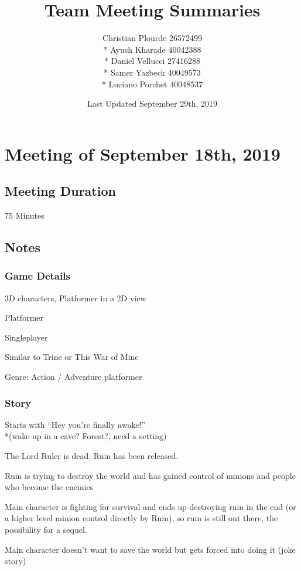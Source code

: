 \documentclass{article}
\begin{document}
\title{Team Meeting Summaries}
\author{Christian Plourde 26572499\\*
		Ayush Kharade 40042388\\*
		Daniel Vellucci 27416288\\*
		Samer Yazbeck 40049573\\*
		Luciano Porchet 40048537
		}
\date{Last Updated September 29th, 2019}

\maketitle

\newpage

\section{Meeting of September 18th, 2019}

\subsection{Meeting Duration}
75 Minutes

\subsection{Notes}
\subsubsection{Game Details}
\begin{description}
\item 3D characters, Platformer in a 2D view
\item Platformer
\item Singleplayer
\item Similar to Trine or This War of Mine
\item Genre: Action / Adventure platformer
\end{description}

\subsubsection{Story}
\begin{description}
\item Starts with “Hey you're finally awake!”\\*(wake up in a cave? Forest?, need a setting)
\item The Lord Ruler is dead, Ruin has been released.
\item Ruin is trying to destroy the world and has gained control of minions and people who become the enemies
\item Main character is fighting for survival and ends up destroying ruin in the end (or a higher level minion control directly by Ruin), so ruin is still out there, the possibility for a sequel.
\item Main character doesn't want to save the world but gets forced into doing it (joke story) 
\end{description}
\end{document}
